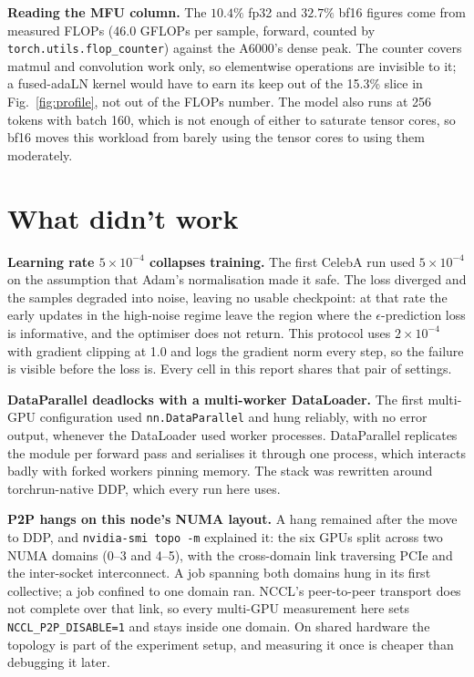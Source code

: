 \documentclass{article}
\begin{document}
\textbf{Reading the MFU column.} The $10.4\%$ fp32 and $32.7\%$ bf16 figures come from measured
FLOPs (46.0 GFLOPs per sample, forward, counted by \texttt{torch.utils.flop\_counter}) against
the A6000's dense peak. The counter covers matmul and convolution work only, so elementwise
operations are invisible to it; a fused-adaLN kernel would have to earn its keep out of the
15.3\% slice in Fig.~\ref{fig:profile}, not out of the FLOPs number. The model also runs at 256
tokens with batch 160, which is not enough of either to saturate tensor cores, so bf16 moves
this workload from barely using the tensor cores to using them moderately.

\section{What didn't work}
\label{sec:failures}

\textbf{Learning rate $5\times10^{-4}$ collapses training.} The first CelebA run used
$5\times10^{-4}$ on the assumption that Adam's normalisation made it safe. The loss diverged
and the samples degraded into noise, leaving no usable checkpoint: at that rate the early
updates in the high-noise regime leave the region where the $\epsilon$-prediction loss is
informative, and the optimiser does not return. This protocol uses $2\times10^{-4}$ with
gradient clipping at 1.0 and logs the gradient norm every step, so the failure is visible
before the loss is. Every cell in this report shares that pair of settings.

\textbf{DataParallel deadlocks with a multi-worker DataLoader.} The first multi-GPU
configuration used \texttt{nn.DataParallel} and hung reliably, with no error output, whenever
the DataLoader used worker processes. DataParallel replicates the module per forward pass and
serialises it through one process, which interacts badly with forked workers pinning memory.
The stack was rewritten around torchrun-native DDP, which every run here uses.

\textbf{P2P hangs on this node's NUMA layout.} A hang remained after the move to DDP, and
\texttt{nvidia-smi topo -m} explained it: the six GPUs split across two NUMA domains (0--3 and
4--5), with the cross-domain link traversing PCIe and the inter-socket interconnect. A job
spanning both domains hung in its first collective; a job confined to one domain ran. NCCL's
peer-to-peer transport does not complete over that link, so every multi-GPU measurement here
sets \texttt{NCCL\_P2P\_DISABLE=1} and stays inside one domain. On shared hardware the topology
is part of the experiment setup, and measuring it once is cheaper than debugging it later.
\end{document}
